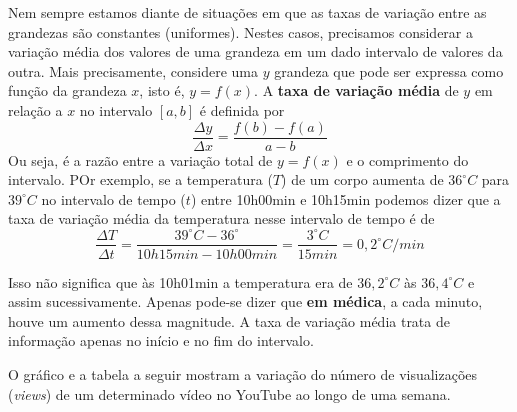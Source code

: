 Nem sempre estamos diante de situações em que as taxas de variação entre as grandezas são constantes (uniformes). Nestes casos, precisamos considerar a variação média dos valores de uma grandeza em um dado intervalo de valores da outra. Mais precisamente, considere uma $y$ grandeza  que pode ser expressa como função da grandeza $x$, isto é, $y=f(x)$. A \textbf{taxa de variação média} de $y$ em relação a $x$ no intervalo $[a,b]$ é definida por
\begin{equation*}
\frac{\Delta y}{\Delta x}=\frac{f(b)-f(a)}{a-b}
\end{equation*}
Ou seja, é a razão entre a variação total de $y=f(x)$ e o comprimento do intervalo. POr exemplo, se a temperatura ($T$) de um corpo aumenta de $36^{\circ}C$ para $39^{\circ}C$ no intervalo de tempo ($t$) entre 10h00min e 10h15min podemos dizer que a taxa de variação média da temperatura nesse intervalo de tempo é de
\begin{equation*}
\frac{\Delta T}{\Delta t}=\frac{39^{\circ}C-36^{\circ}}{10h15min-10h00min}=\frac{3^{\circ}C}{15 min}=0,2^{\circ}C/min
\end{equation*}

Isso não significa que às 10h01min a temperatura era de $36,2^{\circ}C$ às $36,4^{\circ}C$ e assim sucessivamente. Apenas pode-se dizer que \textbf{em médica}, a cada minuto, houve um aumento dessa magnitude. A taxa de variação média trata de informação apenas no início e no fim do intervalo.

O gráfico e a tabela a seguir mostram a variação do número de visualizações (\textit{views}) de um determinado vídeo no YouTube ao longo de uma semana.

